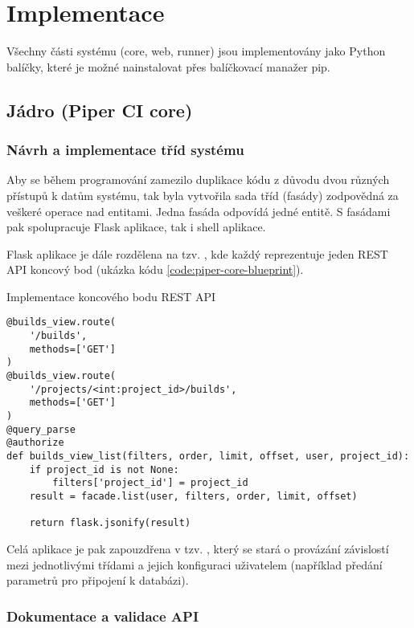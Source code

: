 \chapter{Implementace}

Všechny části systému (core, web, runner) jsou implementovány jako Python balíčky, které je možné nainstalovat přes balíčkovací manažer pip.

\section{Jádro (Piper CI core)}


\subsection{Návrh a implementace tříd systému}


Aby se během programování zamezilo duplikace kódu z důvodu dvou různých přístupů k datům systému, tak byla vytvořila sada tříd (fasády) zodpovědná za veškeré operace nad entitami.
Jedna fasáda odpovídá jedné entitě.
S fasádami pak spolupracuje Flask aplikace, tak i shell aplikace.

Flask aplikace je dále rozdělena na tzv. , kde každý reprezentuje jeden REST API koncový bod (ukázka kódu \ref{code:piper-core-blueprint}).

\begin{listing}[ht]
\caption{\label{code:piper-core-blueprint}Implementace koncového bodu REST API}
\begin{verbatim}
@builds_view.route(
    '/builds',
    methods=['GET']
)
@builds_view.route(
    '/projects/<int:project_id>/builds',
    methods=['GET']
)
@query_parse
@authorize
def builds_view_list(filters, order, limit, offset, user, project_id):
    if project_id is not None:
        filters['project_id'] = project_id
    result = facade.list(user, filters, order, limit, offset)

    return flask.jsonify(result)
\end{verbatim}
\end{listing}

Celá aplikace je pak zapouzdřena v tzv. , který se stará o provázání závislostí mezi jednotlivými třídami a jejich konfiguraci uživatelem (například předání parametrů pro připojení k databázi).

\subsection{Dokumentace a validace API}


